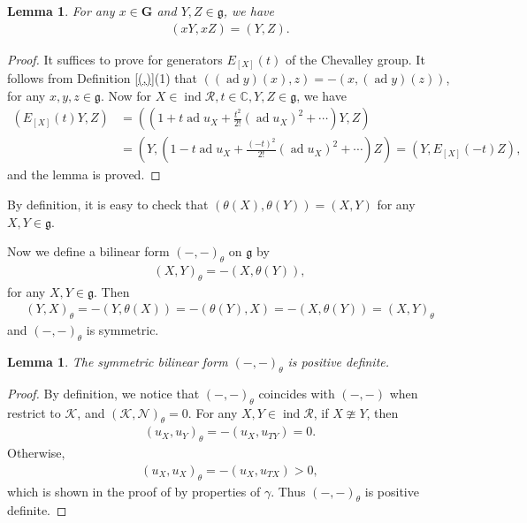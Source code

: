 \documentclass[10pt,a4paper]{amsart}
\newtheorem{lemma}[theorem]{Lemma}
\begin{document}
\begin{lemma}
    For any $x\in \mathbf{G}$ and $Y,Z\in \mathfrak{g}$, we have 
    \begin{align*}
        (xY,xZ)=(Y,Z).
    \end{align*}
\end{lemma}

\begin{proof}
    It suffices to prove for generators $E_{[X]}(t)$ of the Chevalley group.
    It follows from Definition \ref{(,)}(1) that $((\operatorname{ad}y)(x),z)=-(x,(\operatorname{ad}y)(z))$, for any $x,y,z\in \mathfrak{g}$.
    Now for $X\in \operatorname{ind}\mathcal{R},t\in \mathbb{C},Y,Z\in \mathfrak{g}$, we have 
    \begin{align*}
        (E_{[X]}(t)Y,Z)&=((1+t\operatorname{ad}u_X+\frac{t^2}{2!}(\operatorname{ad}u_X)^2+\cdots)Y,Z)\\
       & =(Y,(1-t\operatorname{ad}u_X+\frac{(-t)^2}{2!}(\operatorname{ad}u_X)^2+\cdots)Z)=(Y,E_{[X]}(-t)Z),
    \end{align*}
    and the lemma is proved.
\end{proof}

By definition, it is easy to check that $(\theta (X),\theta (Y))=(X,Y)$ for any $X,Y\in \mathfrak{g}$.

Now we define a bilinear form $(-,-)_{\theta}$ on $\mathfrak{g}$ by 
\begin{align*}
    (X,Y)_{\theta}=-(X,\theta (Y)),
\end{align*}
for any $X,Y\in \mathfrak{g}$.
Then 
\begin{align*}
    (Y,X)_{\theta}=-(Y,\theta(X))=-(\theta(Y),X)=-(X,\theta (Y))=(X,Y)_{\theta}
\end{align*}
and $(-,-)_{\theta}$ is symmetric.

\begin{lemma}
    The symmetric bilinear form $(-,-)_{\theta}$ is positive definite.
\end{lemma}

\begin{proof}
    By definition, we notice that $(-,-)_{\theta}$ coincides with $(-,-)$ when restrict to $\mathcal{K}$, and $(\mathcal{K},\mathcal{N})_{\theta}=0$.
    For any $X,Y\in \operatorname{ind}\mathcal{R}$, if $X\ncong Y$, then 
    \begin{align*}
        (u_X,u_Y)_{\theta}=-(u_X,u_{TY})=0.
    \end{align*}
    Otherwise,
    \begin{align*}
        (u_X,u_X)_{\theta}=-(u_X,u_{TX})>0,
    \end{align*}
    which is shown in the proof of \cite[Proposition 30]{notes2} by properties of $\gamma$.
    Thus $(-,-)_{\theta}$ is positive definite.
\end{proof}
\end{document}
